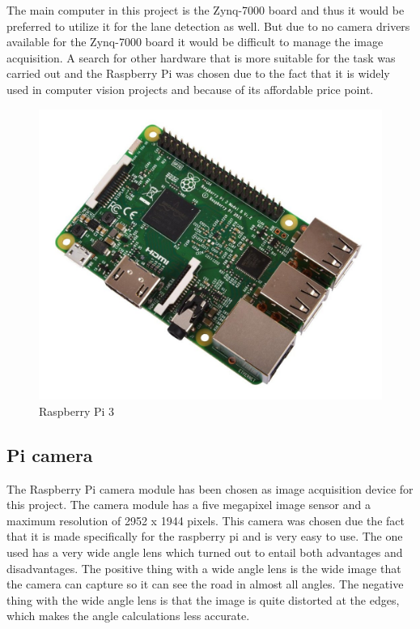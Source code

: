 The main computer in this project is the Zynq-7000 board and thus it would be preferred to utilize it for the lane detection as well. But due to no camera drivers available for the Zynq-7000 board it would be difficult to manage the image acquisition. A search for other hardware that is more suitable for the task was carried out and the Raspberry Pi was chosen due to the fact that it is widely used in computer vision projects and because of its affordable price point.

\begin{figure}[H]
  \includegraphics[scale=0.3]{./img/rpi.jpg}
  \centering
  \caption{Raspberry Pi 3}
  \label{fig:RPI}
\end{figure}

\subsection{Pi camera}
The Raspberry Pi camera module has been chosen as image acquisition device for this project. The camera module has a five megapixel image sensor and a maximum resolution of 2952 x 1944 pixels. This camera was chosen due the fact that it is made specifically for the raspberry pi and is very easy to use. The one used has a very wide angle lens which turned out to entail both advantages and disadvantages. The positive thing with a wide angle lens is the wide image that the camera can capture so it can see the road in almost all angles. The negative thing with the wide angle lens is that the image is quite distorted at the edges, which makes the angle calculations less accurate. 

